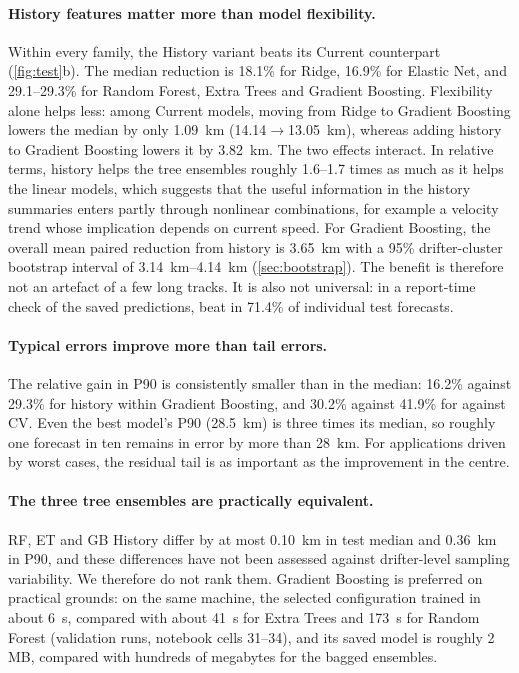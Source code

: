 \paragraph{History features matter more than model flexibility.} Within every family, the History variant beats its Current counterpart (\cref{fig:test}b). The median reduction is 18.1\% for Ridge, 16.9\% for Elastic Net, and 29.1--29.3\% for Random Forest, Extra Trees and Gradient Boosting. Flexibility alone helps less: among Current models, moving from Ridge to Gradient Boosting lowers the median by only \SI{1.09}{km} (\SI{14.14}{}$\to$\SI{13.05}{km}), whereas adding history to Gradient Boosting lowers it by \SI{3.82}{km}. The two effects interact. In relative terms, history helps the tree ensembles roughly 1.6--1.7 times as much as it helps the linear models, which suggests that the useful information in the history summaries enters partly through nonlinear combinations, for example a velocity trend whose implication depends on current speed. For Gradient Boosting, the overall mean paired reduction from history is \SI{3.65}{km} with a 95\% drifter-cluster bootstrap interval of \SIrange{3.14}{4.14}{km} (\cref{sec:bootstrap}). The benefit is therefore not an artefact of a few long tracks. It is also not universal: in a report-time check of the saved predictions, \GBH{} beat \GBC{} in 71.4\% of individual test forecasts.

\paragraph{Typical errors improve more than tail errors.} The relative gain in P90 is consistently smaller than in the median: 16.2\% against 29.3\% for history within Gradient Boosting, and 30.2\% against 41.9\% for \GBH{} against CV. Even the best model's P90 (\SI{28.5}{km}) is three times its median, so roughly one forecast in ten remains in error by more than \SI{28}{km}. For applications driven by worst cases, the residual tail is as important as the improvement in the centre.

\paragraph{The three tree ensembles are practically equivalent.} RF, ET and GB History differ by at most \SI{0.10}{km} in test median and \SI{0.36}{km} in P90, and these differences have not been assessed against drifter-level sampling variability. We therefore do not rank them. Gradient Boosting is preferred on practical grounds: on the same machine, the selected configuration trained in about \SI{6}{s}, compared with about \SI{41}{s} for Extra Trees and \SI{173}{s} for Random Forest (validation runs, notebook cells 31--34), and its saved model is roughly 2\,MB, compared with hundreds of megabytes for the bagged ensembles.


